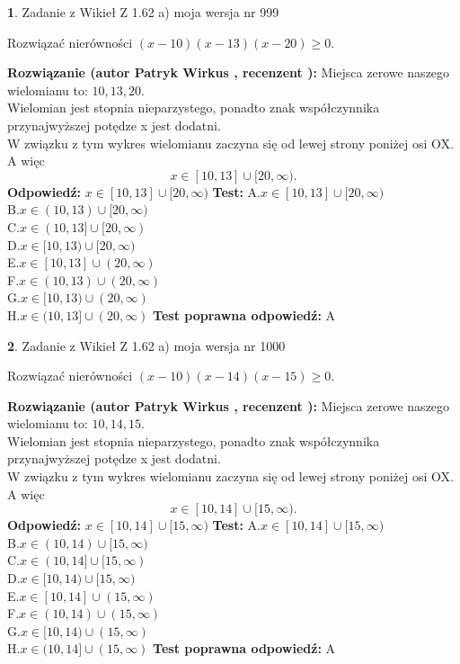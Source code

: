\documentclass[12pt, a4paper]{article}
\theoremstyle{definition} %
\newtheorem{zad}{}
\newcommand{\zadStart}[1]{\begin{zad}#1\newline}
\newcommand{\zadStop}{\end{zad}}
\newcommand{\rozwStart}[2]{\noindent \textbf{Rozwiązanie (autor #1 , recenzent #2): }\newline}
\newcommand{\rozwStop}{\newline}
\newcommand{\odpStart}{\noindent \textbf{Odpowiedź:}\newline}
\newcommand{\odpStop}{\newline}
\newcommand{\testStart}{\noindent \textbf{Test:}\newline}
\newcommand{\testStop}{\newline}
\newcommand{\kluczStart}{\noindent \textbf{Test poprawna odpowiedź:}\newline}
\newcommand{\kluczStop}{\newline}
\begin{document}
\zadStart{Zadanie z Wikieł Z 1.62 a) moja wersja nr 999}

Rozwiązać nierówności $(x-10)(x-13)(x-20)\ge0$.
\zadStop
\rozwStart{Patryk Wirkus}{}
Miejsca zerowe naszego wielomianu to: $10, 13, 20$.\\
Wielomian jest stopnia nieparzystego, ponadto znak współczynnika przy\linebreak najwyższej potędze x jest dodatni.\\ W związku z tym wykres wielomianu zaczyna się od lewej strony poniżej osi OX. A więc $$x \in [10,13] \cup [20,\infty).$$
\rozwStop
\odpStart
$x \in [10,13] \cup [20,\infty)$
\odpStop
\testStart
A.$x \in [10,13] \cup [20,\infty)$\\
B.$x \in (10,13) \cup [20,\infty)$\\
C.$x \in (10,13] \cup [20,\infty)$\\
D.$x \in [10,13) \cup [20,\infty)$\\
E.$x \in [10,13] \cup (20,\infty)$\\
F.$x \in (10,13) \cup (20,\infty)$\\
G.$x \in [10,13) \cup (20,\infty)$\\
H.$x \in (10,13] \cup (20,\infty)$
\testStop
\kluczStart
A
\kluczStop



\zadStart{Zadanie z Wikieł Z 1.62 a) moja wersja nr 1000}

Rozwiązać nierówności $(x-10)(x-14)(x-15)\ge0$.
\zadStop
\rozwStart{Patryk Wirkus}{}
Miejsca zerowe naszego wielomianu to: $10, 14, 15$.\\
Wielomian jest stopnia nieparzystego, ponadto znak współczynnika przy\linebreak najwyższej potędze x jest dodatni.\\ W związku z tym wykres wielomianu zaczyna się od lewej strony poniżej osi OX. A więc $$x \in [10,14] \cup [15,\infty).$$
\rozwStop
\odpStart
$x \in [10,14] \cup [15,\infty)$
\odpStop
\testStart
A.$x \in [10,14] \cup [15,\infty)$\\
B.$x \in (10,14) \cup [15,\infty)$\\
C.$x \in (10,14] \cup [15,\infty)$\\
D.$x \in [10,14) \cup [15,\infty)$\\
E.$x \in [10,14] \cup (15,\infty)$\\
F.$x \in (10,14) \cup (15,\infty)$\\
G.$x \in [10,14) \cup (15,\infty)$\\
H.$x \in (10,14] \cup (15,\infty)$
\testStop
\kluczStart
A
\kluczStop
\end{document}
